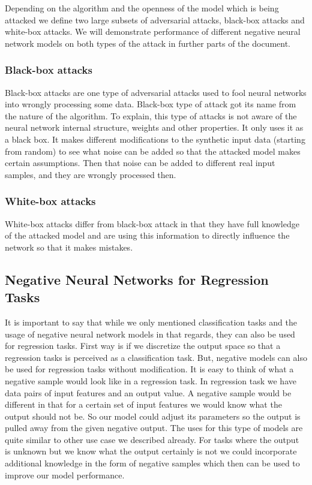 \documentclass[b5paper]{book}
\begin{document}
Depending on the algorithm and the openness of the model which is being attacked we define two large subsets of adversarial attacks, black-box attacks and white-box attacks. We will demonstrate performance of different negative neural network models on both types of the attack in further parts of the document.

\subsubsection{Black-box attacks}

Black-box attacks are one type of adversarial attacks used to fool neural networks into wrongly processing some data. Black-box type of attack got its name from the nature of the algorithm. To explain, this type of attacks is not aware of the neural network internal structure, weights and other properties. It only uses it as a black box. It makes different modifications to the synthetic input data (starting from random) to see what noise can be added so that the attacked model makes certain assumptions. Then that noise can be added to different real input samples, and they are wrongly processed then. 

\subsubsection{White-box attacks}

White-box attacks differ from black-box attack in that they have full knowledge of the attacked model and are using this information to directly influence the network so that it makes mistakes.


\subsection{Negative Neural Networks for Regression Tasks}

It is important to say that while we only mentioned classification tasks and the usage of negative neural network models in that regards, they can also be used for regression tasks. First way is if we discretize the output space so that a regression tasks is perceived as a classification task. But, negative models can also be used for regression tasks without modification. It is easy to think of what a negative sample would look like in a regression task. In regression task we have data pairs of input features and an output value. A negative sample would be different in that for a certain set of input features we would know what the output should not be. So our model could adjust its parameters so the output is pulled away from the given negative output. The uses for this type of models are quite similar to other use case we described already. For tasks where the output is unknown but we know what the output certainly is not we could incorporate additional knowledge in the form of negative samples which then can be used to improve our model performance. 
\end{document}
